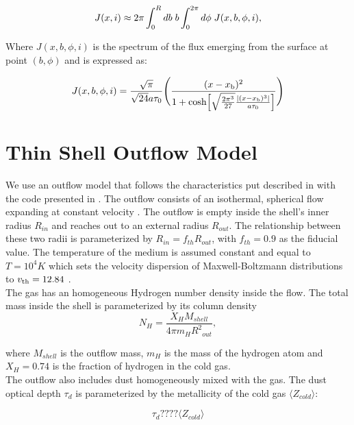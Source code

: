 \begin{equation}
	J(x,i) \approx 2\pi \int_0^Rdb {\hspace{1mm}} b
	\int_0^{2\pi}d\phi {\hspace{1mm}} J(x,b,\phi,i),
\end{equation}

Where $J(x, b, \phi, i)$ is the spectrum of the flux emerging from the surface at point $(b, \phi)$ and is expressed as: 

\begin{equation}
	J(x,b,\phi,i)=\frac{\sqrt{\pi}}{\sqrt{24}a\tau_0}\Bigg{(}\frac{(x-x_{\rm
			b})^2}{1+{\rm cosh}\Big{[}\sqrt{\frac{2\pi^3}{27}}\frac{|(x-x_{\rm
				b})^3|}{a\tau_0}\Big{]}}\Bigg{)} 
\end{equation}


\section{Thin Shell Outflow Model}

We use an outflow model that follows the characteristics put described in \cite{Verhamme06} with the code presented in \cite{Orsi12}. The outflow consists of an isothermal, spherical flow expanding at constant velocity \vout.  The outflow is empty inside the shell's inner radius $R_{in}$ and reaches out to an external radius $R_{out}$. The relationship between these two radii is parameterized by $R_{in} = f_{th}R_{out}$, with $f_{th}=0.9$ as the fiducial value. The temperature of the medium is assumed constant and equal to $T=10^4 K$ which sets the velocity dispersion of Maxwell-Boltzmann distributions to $v_{\rm th}=12.84$ \kms. \\

The gas has an homogeneous Hydrogen number density inside the flow. The total mass inside the shell is parameterized by its column density\\

\begin{equation}
	\label{eq:nh}
	N_H = \frac{X_H M_{shell}}{4\pi m_H {R^2}_{out}},
\end{equation}

where $M_{shell}$ is the outflow mass, $m_H$ is the mass of the hydrogen atom and $X_H=0.74$ is the fraction of hydrogen in the cold gas.\\

The outflow also includes dust homogeneously mixed with the gas. The dust optical depth $\tau_d$ is parameterized by the metallicity of the cold gas $\langle Z_{cold} \rangle$: 

\begin{equation}
	\label{eq:z}
	\tau_{d} ???? \langle Z_{cold} \rangle
\end{equation}

